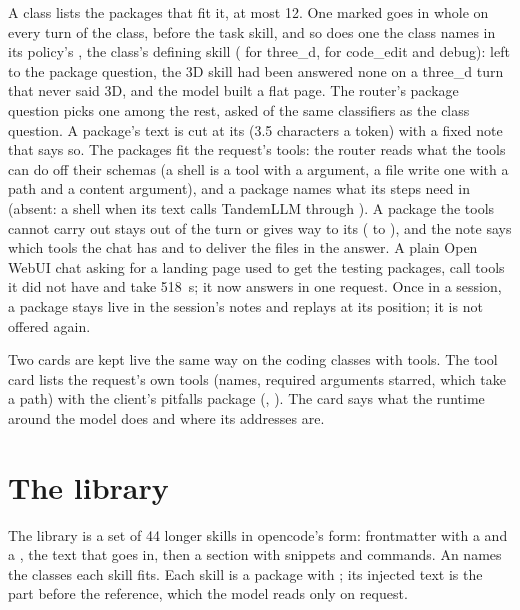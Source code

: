 A class lists the packages that fit it, at most 12. One marked  goes in whole on every turn of the class, before the task skill, and so does one the class names in its policy's , the class's defining skill ( for three\_d,  for code\_edit and debug): left to the package question, the 3D skill had been answered none on a three\_d turn that never said 3D, and the model built a flat page. The router's package question picks one among the rest, asked of the same classifiers as the class question. A package's text is cut at its  (3.5 characters a token) with a fixed note that says so. The packages fit the request's tools: the router reads what the tools can do off their schemas (a shell is a tool with a  argument, a file write one with a path and a content argument), and a package names what its steps need in  (absent: a shell when its text calls TandemLLM through ). A package the tools cannot carry out stays out of the turn or gives way to its  ( to ), and the note says which tools the chat has and to deliver the files in the answer. A plain Open WebUI chat asking for a landing page used to get the testing packages, call tools it did not have and take 518~s; it now answers in one request. Once in a session, a package stays live in the session's notes and replays at its position; it is not offered again.

Two cards are kept live the same way on the coding classes with tools. The tool card lists the request's own tools (names, required arguments starred, which take a path) with the client's pitfalls package (, ). The  card says what the runtime around the model does and where its addresses are.

\section{The library}\label{sec:library}

The library is a set of 44 longer skills in opencode's  form: frontmatter with a  and a , the text that goes in, then a  section with snippets and commands. An  names the classes each skill fits. Each skill is a package with ; its injected text is the part before the reference, which the model reads only on request.


